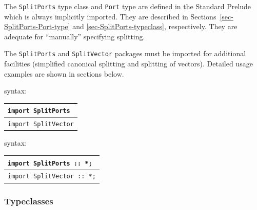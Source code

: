 The {\tt SplitPorts} type class and {\tt Port} type are defined in the
Standard Prelude which is always implicitly imported.  They are
described in Sections~\ref{sec-SplitPorts-Port-type} and
\ref{sec-SplitPorts-typeclass}, respectively.  They are adequate for
``manually'' specifying splitting.

The {\tt SplitPorts} and {\tt SplitVector} packages must be imported
for additional facilities (simplified canonical splitting and
splitting of vectors). Detailed usage examples are shown in sections
below.

\begin{center}
  \begin{minipage}[t]{0.3\textwidth}
    {\BHb} syntax:

    \begin{tabular}{|l|}
      \hline
      {\tt import SplitPorts} \\
      \hline
      {\tt import SplitVector} \\
      \hline
    \end{tabular}
  \end{minipage}
  \hspace*{2em}
  \begin{minipage}[t]{0.3\textwidth}
    {\BSVb} syntax:

    \begin{tabular}{|l|}
      \hline
      {\tt import SplitPorts :: *;} \\
      \hline
      {\tt import SplitVector :: *;} \\
      \hline
    \end{tabular}
  \end{minipage}
\end{center}


\subsubsection{Typeclasses}

\label{sec:splitports_shallow_deep}





